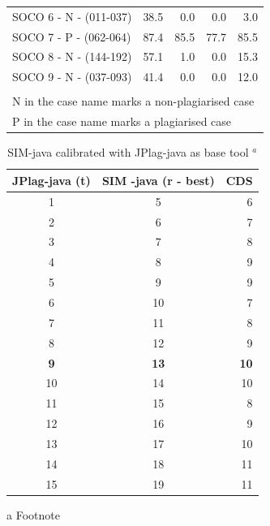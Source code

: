 \documentclass[a4paper, 12pt, oneside, openany, final, pdftex]{book}\usepackage[]{graphicx}\usepackage[]{color}
\begin{document}
\begin{table} [bt]
\begin{tabular}{l r r | r r}
		SOCO 6 - N - (011-037)             &  38.5 &   0.0 &   0.0 &   3.0\\ 
		SOCO 7 - P - (062-064)             &  87.4 &  85.5 &  77.7 &  85.5\\ 
		SOCO 8 - N - (144-192)             &  57.1 &   1.0 &   0.0 &  15.3\\ 
		SOCO 9 - N - (037-093)             &  41.4 &   0.0 &   0.0 &  12.0\\ 
		\bottomrule 
		\hiderowcolors 
		\multicolumn{5}{l}{\footnotesize \textit{Note: }}\\ 
		\multicolumn{5}{l}{\footnotesize N in the case name marks a non-plagiarised case}\\ 
		\multicolumn{5}{l}{\footnotesize P in the case name marks a plagiarised case}\\ 
	\end{tabular} 
\end{table} 

\begin{table} [bt] 
	\centering 
	\caption{SIM-java calibrated with JPlag-java as base tool $^a$ } 
	\label{tbl:JPlagSIMJavaDiffs}  

\begin{threeparttable}
\begin{tabular}{ccr}
\toprule
\multicolumn{1}{c}{\textbf{JPlag-java (t)}} & \multicolumn{1}{c}{\textbf{SIM -java (r - best)}} & \multicolumn{1}{c}{\textbf{CDS}}\\
\midrule
\rowcolor{gray!6}  1 & 5 & 6\\
2 & 6 & 7\\
\rowcolor{gray!6}  3 & 7 & 8\\
4 & 8 & 9\\
\rowcolor{gray!6}  5 & 9 & 9\\
6 & 10 & 7\\
\rowcolor{gray!6}  7 & 11 & 8\\
8 & 12 & 9\\
\rowcolor{gray!6}  \textbf{9} & \textbf{13} & \textbf{10}\\
10 & 14 & 10\\
\rowcolor{gray!6}  11 & 15 & 8\\
12 & 16 & 9\\
\rowcolor{gray!6}  13 & 17 & 10\\
14 & 18 & 11\\
\rowcolor{gray!6}  15 & 19 & 11\\
\bottomrule
\end{tabular}
\begin{tablenotes}
\item[a] Footnote
\end{tablenotes}
\end{threeparttable}


\end{table} 
\end{document}
